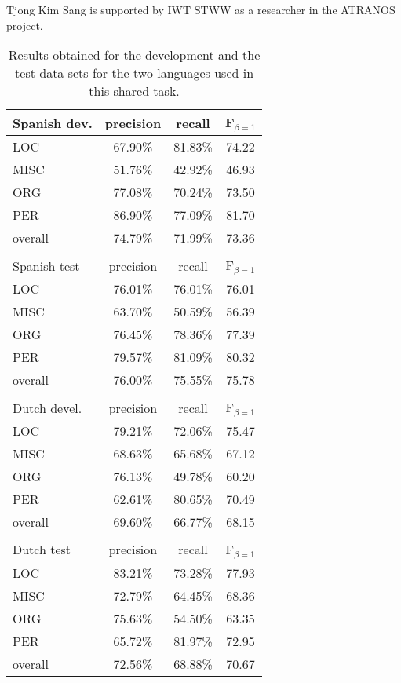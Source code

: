 \documentclass[11pt]{article}
\begin{document}
Tjong Kim Sang is supported by IWT STWW as a researcher in the ATRANOS 
project.

\begin{table}[t]
\begin{center}
\begin{tabular}{|l|c|c|c|}\cline{2-4}
\multicolumn{1}{l|}{Spanish dev.}
                 & precision & recall & F$_{\beta=1}$ \\\hline
LOC     & 67.90\% & 81.83\% & 74.22 \\
MISC    & 51.76\% & 42.92\% & 46.93 \\
ORG     & 77.08\% & 70.24\% & 73.50 \\
PER     & 86.90\% & 77.09\% & 81.70 \\\hline
overall & 74.79\% & 71.99\% & 73.36 \\\hline
\multicolumn{4}{c}{}\\\cline{2-4}
\multicolumn{1}{l|}{Spanish test}
                 & precision & recall & F$_{\beta=1}$ \\\hline
LOC     & 76.01\% & 76.01\% & 76.01 \\
MISC    & 63.70\% & 50.59\% & 56.39 \\
ORG     & 76.45\% & 78.36\% & 77.39 \\
PER     & 79.57\% & 81.09\% & 80.32 \\\hline
overall & 76.00\% & 75.55\% & 75.78 \\\hline
\multicolumn{4}{c}{}\\\cline{2-4}
\multicolumn{1}{l|}{Dutch devel.}
                 & precision & recall & F$_{\beta=1}$ \\\hline
LOC     & 79.21\% & 72.06\% & 75.47 \\
MISC    & 68.63\% & 65.68\% & 67.12 \\
ORG     & 76.13\% & 49.78\% & 60.20 \\
PER     & 62.61\% & 80.65\% & 70.49 \\\hline
overall & 69.60\% & 66.77\% & 68.15 \\\hline
\multicolumn{4}{c}{}\\\cline{2-4}
\multicolumn{1}{l|}{Dutch test}
                 & precision & recall & F$_{\beta=1}$ \\\hline
LOC     & 83.21\% & 73.28\% & 77.93 \\
MISC    & 72.79\% & 64.45\% & 68.36 \\
ORG     & 75.63\% & 54.50\% & 63.35 \\
PER     & 65.72\% & 81.97\% & 72.95 \\\hline
overall & 72.56\% & 68.88\% & 70.67 \\\hline
\end{tabular}
\end{center}
\caption{
Results obtained for the development and the test data sets for the
two languages used in this shared task.
} 
\label{tab-final}
\end{table}

\small



\end{document}
